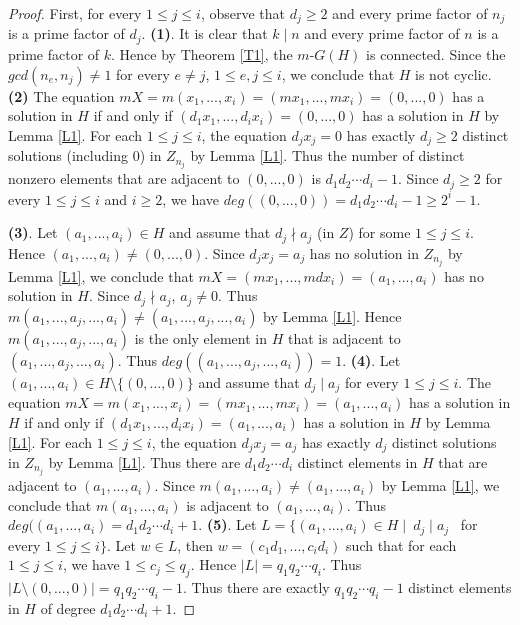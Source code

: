 \documentclass[10pt,a4paper]{amsart}
\begin{document}
\begin{proof}
	 First, for every $1 \leq j \leq i$, observe that $d_j \geq 2$ and every prime factor of $n_j$ is a prime factor of $d_j$.
	 \vskip0.1in
	{\bf (1)}. It is clear that $k \mid n$ and every prime factor of $n$ is a prime factor of $k$. Hence by Theorem \ref{T1}, the $m$-$G(H)$ is connected. Since the $gcd(n_e, n_j) \not = 1$ for every $e \not = j$, $1 \leq e, j \leq i$, we conclude that $H$ is not cyclic.
	\vskip0.1in
	{\bf (2)} The equation $mX = m(x_1,..., x_i) = (mx_1, ... , mx_i) = (0, ..., 0)$ has a solution in $H$ if and only if $(d_1x_1, ... , d_ix_i) = (0, ... , 0)$ has a solution in $H$ by Lemma \ref{L1}. For each $1 \leq j \leq i$, the equation $d_jx_j = 0$ has exactly $d_j \geq 2$ distinct solutions (including 0) in $Z_{n_j}$ by Lemma \ref{L1}. Thus the number of distinct nonzero elements that are adjacent to $(0, ... , 0)$ is $d_1d_2 \cdots d_i - 1$. Since $d_j \geq 2$ for every $1\leq j \leq i$ and $i \geq 2$, we have $deg((0, ... , 0)) = d_1d_2 \cdots d_i - 1 \geq 2^i - 1$.

{\bf (3)}. Let $(a_1, ..., a_i) \in H$ and assume that $d_j \nmid a_j$ (in $Z$) for some $1 \leq j \leq i$. Hence $(a_1, ... , a_i) \not = (0, ... , 0)$. Since $d_jx_j = a_j$ has no solution in $Z_{n_j}$ by Lemma \ref{L1}, we conclude that $mX = (mx_1, ..., mdx_i) = (a_1, ... , a_i)$ has no solution in $H$. Since $d_j \nmid a_j$, $a_j \not = 0$. Thus $m(a_1, ..., a_j, ..., a_i) \not = (a_1, ..., a_j, ... , a_i)$ by Lemma \ref{L1}. Hence $m(a_1, ..., a_j, ..., a_i)$ is the only element in $H$ that is adjacent to $(a_1, ..., a_j, ..., a_i)$. Thus $deg((a_1, ..., a_j, ..., a_i)) = 1$.
\vskip0.1in
{\bf (4)}. Let $(a_1, ..., a_i) \in H \setminus \{ (0, ..., 0)\}$ and assume that $d_j \mid a_j$ for every $1 \leq j \leq i$. The equation $mX = m(x_1,..., x_i) = (mx_1, ... , mx_i) = (a_1, ..., a_i)$ has a solution in $H$ if and only if $(d_1x_1, ... , d_ix_i) = (a_1, ... , a_i)$ has a solution in $H$ by Lemma \ref{L1}. For each $1 \leq j \leq i$, the equation $d_jx_j = a_j$ has exactly $d_j$ distinct solutions  in $Z_{n_j}$ by Lemma \ref{L1}. Thus there are $d_1d_2 \cdots d_i$ distinct elements in $H$ that are adjacent to $(a_1, ... , a_i)$. Since $m(a_1, ..., a_i) \not = (a_1, ..., a_i)$ by Lemma \ref{L1}, we conclude that $m(a_1, ..., a_i)$ is adjacent to $(a_1, ..., a_i)$. Thus $deg((a_1, ... , a_i) = d_1d_2 \cdots d_i + 1$.
\vskip 0.1in
{\bf (5)}. Let $L = \{(a_1, ..., a_i) \in H \mid \   d_j \mid a_j$ \ for every $1 \leq j \leq i\}$. Let $w \in L$, then $w = (c_1d_1, ..., c_id_i)$ such that for each $1 \leq j \leq i$, we have $1 \leq c_j \leq q_j$. Hence $|L| = q_1q_2 \cdots q_i$. Thus $|L \setminus (0, ... , 0)| = q_1q_2 \cdots q_i - 1$. Thus there are exactly $q_1q_2 \cdots q_i - 1$ distinct elements in $H$ of degree $d_1d_2 \cdots d_i + 1$.


\end{proof}
\end{document}
